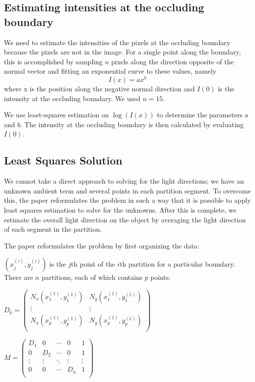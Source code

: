 \documentclass[10pt,twocolumn,letterpaper]{article}
\begin{document}
\subsection{Estimating intensities at the occluding boundary}
We need to estimate the intensities of the pixels at the occluding boundary because the pixels are not in the image. For a single point along the boundary, this is accomplished by sampling $n$ pixels along the direction opposite of the normal vector and fitting an exponential curve to these values, namely \[I(x) = ax^{b}\] where x is the position along the negative normal direction and $I(0)$ is the intensity at the occluding boundary. We used $n = 15$.

We use least-squares estimation on $\log(I(x))$ to determine the parameters $a$ and $b$. The intensity at the occluding boundary is then calculated by evaluating $I(0)$.

\subsection{Least Squares Solution}
We cannot take a direct approach to solving for the light directions; we have an unknown ambient term and several points in each partition segment. To overcome this, the paper reformulates the problem in such a way that it is possible to apply least squares estimation to solve for the unknowns. After this is complete, we estimate the overall light direction on the object by averaging the light direction of each segment in the partition.

The paper reformulates the problem by first organizing the data:

$(x^{(i)}_j,y^{(i)}_j)$ is the $j$th point of the $i$th partition for a particular boundary. There are $n$ partitions, each of which contains $p$ points.

$D_k = 
\begin{pmatrix}
N_x(x^{(1)}_1,y^{(1)}_1) & N_y(x^{(1)}_1,y^{(1)}_1) \\
	\vdots & \vdots\\
	N_x(x^{(1)}_p,y^{(1)}_p) & N_y(x^{(1)}_p,y^{(1)}_p) \\
	\end{pmatrix}$

	
$M = 
	\begin{pmatrix}
	D_1 & 0 &\cdots & 0 & 1\\
	0 & D_2 &\cdots & 0 & 1\\
 	\vdots & \vdots & \ddots & \vdots& \vdots\\
	0 & 0 & \cdots & D_n & 1\\
	\end{pmatrix}$
	
\end{document}
